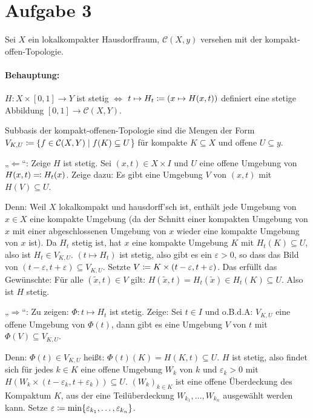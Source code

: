 \documentclass{article}
\begin{document}
\section*{Aufgabe 3}

Sei $X$ ein lokalkompakter Hausdorffraum, $\mathcal C(X,y)$ versehen mit der  kompakt-offen-Topologie.

\paragraph{Behauptung:} $H:X\times [0,1]\to Y$ ist stetig $\iff$ $t\mapsto H_t \da (x\mapsto H(x,t))$ definiert eine stetige Abbildung $[0,1]\to \mathcal C(X,Y)$.

Subbasis der kompakt-offenen-Topologie sind die Mengen der Form $V_{K,U}\da \{f\in \mathcal C(X,Y) \mid f(K)\subseteq U$\} für kompakte $K\subseteq X$ und offene $U\subseteq y$.

„$\Longleftarrow$“: Zeige $H$ ist stetig. Sei $(x,t)\in X\times I$ und $U$ eine offene Umgebung von $H(x,t)\ad H_t(x)$. Zeige dazu: Es gibt eine Umgebung $V$ von $(x,t)$ mit $H(V)\subseteq U$.

Denn: Weil $X$ lokalkompakt und hausdorff’sch ist, enthält jede Umgebung von $x\in X$ eine kompakte Umgebung (da der Schnitt einer kompakten Umgebung von $x$ mit einer abgeschlossenen Umgebung von $x$ wieder eine kompakte Umgebung von $x$ ist).
Da $H_t$ stetig ist, hat $x$ eine kompakte Umgebung $K$ mit $H_t(K)\subseteq U$, also ist $H_t \in V_{K,U}$. $(t\mapsto H_t)$ ist stetig, also gibt es ein $\varepsilon >0$, so dass das Bild von $(t-\varepsilon, t+\varepsilon)\subseteq V_{K,U}$. Setzte $V\da K\times (t-\varepsilon, t+\varepsilon)$. Das erfüllt das Gewünschte: Für alle $(\tilde x,t)\in V$ gilt: $H(\tilde x,t) = H_t(\tilde x) \in H_t(K)\subseteq U$. Also ist $H$ stetig.

„$\Longrightarrow$“: Zu zeigen: $\Phi: t\mapsto H_t$ ist stetig.
Zeige: Sei $t\in I$ und o.B.d.A: $V_{K,U}$ eine offene Umgebung von $\Phi(t)$, dann gibt es eine Umgebung $V$ von $t$ mit $\Phi(V)\subseteq V_{K,U}$.

Denn: $\Phi(t)\in V_{K,U}$ heißt: $\Phi(t)(K) = H(K,t) \subseteq U$. $H$ ist stetig, also findet sich für jedes $k\in K$ eine offene Umgebung $W_k$ von $k$ und $\varepsilon_k >0$ mit $H(W_k\times (t-\varepsilon_k, t+\varepsilon_k))\subseteq U$. $(W_k)_{k\in K}$ ist eine offene Überdeckung des Kompaktum $K$, aus der eine Teilüberdeckung $W_{k_1},\ldots,W_{k_n}$ ausgewählt werden kann. Setze $\varepsilon \da \min \{\varepsilon_{k_1},\ldots,\varepsilon_{k_n}\}$.
\end{document}

